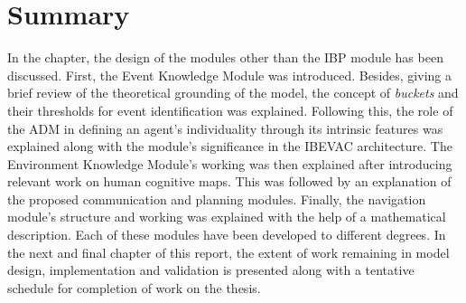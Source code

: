 \section{Summary}
\label{RemainingModulesSummar}

In the chapter, the design of the modules other than the IBP module has been discussed. First, the Event Knowledge Module was introduced. Besides, giving a brief review of the theoretical grounding of the model, the concept of \emph{buckets} and their thresholds for event identification was explained. Following this, the role of the ADM in defining an agent's individuality through its intrinsic features was explained along with the module's significance in the IBEVAC architecture. The Environment Knowledge Module's working was then explained after introducing relevant work on human cognitive maps. This was followed by an explanation of the proposed communication and planning modules. Finally, the navigation module's structure and working was explained with the help of a mathematical description. Each of these modules have been developed to different degrees. In the next and final chapter of this report, the extent of work remaining in model design, implementation and validation is presented along with a tentative schedule for completion of work on the thesis.